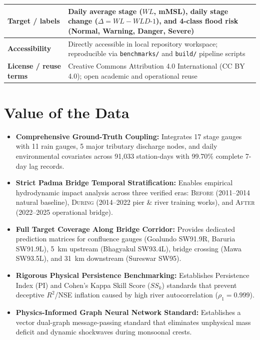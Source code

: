 \documentclass[11pt,a4paper]{article}
\begin{document}
\begin{table}[htbp]
\begin{tabularx}{\linewidth}{|>{\bfseries}p{4.3cm}|X|}
\cellcolor{wordkeybg}Target / labels & Daily average stage ($WL$, mMSL), daily stage change ($\Delta = WL - WLD\text{-}1$), and 4-class flood risk (Normal, Warning, Danger, Severe) \\ \hline
\cellcolor{wordkeybg}Accessibility & Directly accessible in local repository workspace; reproducible via \texttt{benchmarks/} and \texttt{build/} pipeline scripts \\ \hline
\cellcolor{wordkeybg}License / reuse terms & Creative Commons Attribution 4.0 International (CC BY 4.0); open academic and operational reuse \\ \hline
\end{tabularx}
\end{table}

\section{Value of the Data}

\begin{itemize}[leftmargin=18pt,itemsep=2pt]
  \item \textbf{Comprehensive Ground-Truth Coupling:} Integrates 17 stage gauges with 11 rain gauges, 5 major tributary discharge nodes, and daily environmental covariates across 91,033 station-days with 99.70\% complete 7-day lag records.
  \item \textbf{Strict Padma Bridge Temporal Stratification:} Enables empirical hydrodynamic impact analysis across three verified eras: \textsc{Before} (2011--2014 natural baseline), \textsc{During} (2014--2022 pier \& river training works), and \textsc{After} (2022--2025 operational bridge).
  \item \textbf{Full Target Coverage Along Bridge Corridor:} Provides dedicated prediction matrices for confluence gauges (Goalundo SW91.9R, Baruria SW91.9L), 5~km upstream (Bhagyakul SW93.4L), bridge crossing (Mawa SW93.5L), and 31~km downstream (Sureswar SW95).
  \item \textbf{Rigorous Physical Persistence Benchmarking:} Establishes Persistence Index ($\text{PI}$) and Cohen's Kappa Skill Score ($SS_k$) standards that prevent deceptive $R^2$/NSE inflation caused by high river autocorrelation ($\rho_1 = 0.999$).
  \item \textbf{Physics-Informed Graph Neural Network Standard:} Establishes a vector dual-graph message-passing standard that eliminates unphysical mass deficit and dynamic shockwaves during monsoonal crests.
\end{itemize}
\end{document}

